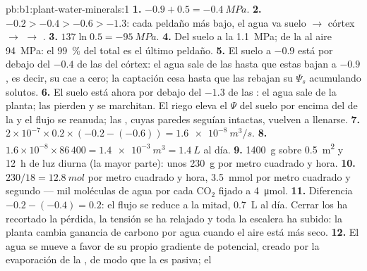 \begin{solution}{pb:b1:plant-water-minerals:1}
\textbf{1.} $-0.9 + 0.5 = \qty{-0.4}{MPa}$.
\textbf{2.} $-0.2 > -0.4 > -0.6 > -1.3$: cada peldaño más bajo, el agua va
suelo $\to$ córtex $\to$  $\to$ .
\textbf{3.} $137\ln 0.5 = \qty{-95}{MPa}$.
\textbf{4.} Del suelo a la  \qty{1.1}{MPa}; de la  al aire
\qty{94}{MPa}: el \qty{99}{\%} del total es el último peldaño.
\textbf{5.} El suelo a $-0.9$ está por debajo del $-0.4$ de las  del
córtex: el agua sale de las  hasta que estas bajan a $-0.9$, es
decir, su  cae a cero; la captación cesa hasta que las 
rebajan su $\Psi_s$ acumulando solutos.
\textbf{6.} El suelo está ahora por debajo del $-1.3$ de las : el agua
sale de la planta; las  pierden  y se marchitan. El riego
eleva el $\Psi$ del suelo por encima del de la  y el flujo se reanuda;
las , cuyas paredes seguían intactas, vuelven a llenarse.
\textbf{7.} $2\times 10^{-7}\times 0.2\times(-0.2 - (-0.6)) =
\qty{1.6e-8}{m^3/s}$.
\textbf{8.} $1.6\times 10^{-8}\times 86\,400 = \qty{1.4e-3}{m^3} =
\qty{1.4}{L}$ al día.
\textbf{9.} \qty{1400}{g} sobre \qty{0.5}{m^2} y \qty{12}{h} de luz diurna
(la mayor parte): unos \qty{230}{g} por metro cuadrado y hora.
\textbf{10.} $230/18 = \qty{12.8}{mol}$ por metro cuadrado y hora, \qty{3.5}{mmol} por metro cuadrado y segundo --- mil moléculas de agua por cada $\mathrm{CO_2}$ fijado a \qty{4}{\micro mol}.
\textbf{11.} Diferencia $-0.2 - (-0.4) = 0.2$: el flujo se reduce a la
mitad, \qty{0.7}{L} al día. Cerrar los  ha recortado la pérdida, la
tensión se ha relajado y toda la escalera ha subido: la planta cambia
ganancia de carbono por agua cuando el aire está más seco.
\textbf{12.} El agua se mueve a favor de su propio gradiente de potencial,
creado por la evaporación de la , de modo que la  es pasiva; el

\end{solution}
